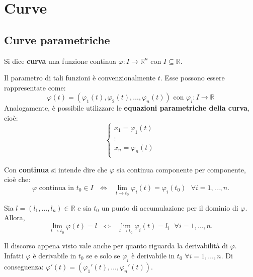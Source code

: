 \chapter{Curve}
\section{Curve parametriche}
\begin{definition}
    Si dice \textbf{curva} una funzione continua $\varphi:I\to\mathbb{R}^n$ con $I\subseteq \mathbb{R}$.
\end{definition}
Il parametro di tali funzioni è convenzionalmente $t$. Esse possono essere rappresentate come:
\begin{equation}
    \varphi(t)=(\varphi_1(t), \varphi_2(t), \dots, \varphi_n(t)) \text{ con }\varphi_i:I \to \mathbb{R}
\end{equation}
Analogamente, è possibile utilizzare le \textbf{equazioni parametriche della curva}, cioè:
\begin{equation}
   \begin{cases}
     x_1=\varphi_1(t)\\
     \vdots\\
     x_n=\varphi_n(t)\\
    \end{cases}
\end{equation}
\begin{oss}
    Con \textbf{continua} si intende dire che $\varphi$ sia continua componente per componente, cioè che:
    \begin{equation}
        \varphi \text{ continua in } t_0 \in I \text{ } \iff \text{ } \lim_{t \to t_0}{\varphi_i(t)}=\varphi_i(t_0) \text{ }\forall i=1, \dots, n.
    \end{equation} 
\end{oss}
\begin{oss}
    Sia $l=(l_1, \dots, l_n)\in\mathbb{R}$ e sia $t_0$ un punto di accumulazione per il dominio di $\varphi$. Allora,
    \begin{equation}
        \lim_{t \to t_0}{\varphi(t)}=l \text{ }\iff \text{ }\lim_{t \to t_0}{\varphi_i(t)}=l_i \text{ } \forall i = 1, \dots, n.
    \end{equation}
\end{oss}
\begin{oss}
    Il discorso appena visto vale anche per quanto riguarda la derivabilità di $\varphi$. Infatti $\varphi$ è derivabile in $t_0$ se e solo se $\varphi_i$ è derivabile in $t_0$ $\forall i=1, \dots, n$. Di conseguenza: $\varphi'(t)=(\varphi_1'(t), \dots, \varphi_n'(t))$.
\end{oss}
